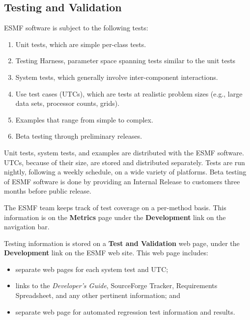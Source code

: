 
\subsection{Testing and Validation}
\label{sec:testing}

ESMF software is subject to the following tests:
\begin{enumerate}
\item Unit tests, which are simple per-class tests.
\item Testing Harness, parameter space spanning tests similar to the unit tests
\item System tests, which generally involve inter-component interactions.
\item Use test cases (UTCs), which are tests at realistic problem
sizes (e.g., large data sets, processor counts, grids).
\item Examples that range from simple to complex.
\item Beta testing through preliminary releases.
\end{enumerate}
Unit tests, system tests, and examples are distributed with the
ESMF software.  UTCs, because of their size, are 
stored and distributed separately.  Tests are run nightly,
following a weekly schedule, on a wide variety of platforms.  
Beta testing of ESMF software is done by providing an Internal Release
to customers three months before public release.  

The ESMF team keeps track of test coverage on a per-method basis.
This information is on the {\bf Metrics} page under the {\bf Development}
link on the navigation bar.

Testing information is stored on a {\bf Test and Validation} web page,
under the {\bf Development} link on the ESMF 
web site.  This web page includes:
\begin{itemize}
\item separate web pages for each system test and UTC;
\item links to the {\it Developer's Guide}, SourceForge Tracker, Requirements 
Spreadsheet, and any other pertinent information; and
\item separate web page for automated regression test information and results.
\end{itemize}

